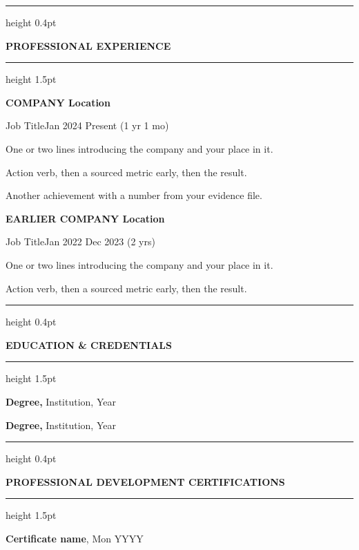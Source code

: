 \documentclass[a4paper,10pt]{article}
\newcommand{\bodyfont}{\fontsize{10.6}{13.1}\selectfont}
\newcommand{\Cap}[1]{{\fontsize{12}{13}\selectfont #1}}
\newcommand{\rsection}[1]{%
  \par\vspace{7pt}%
  {\color{textblack}\hrule height 0.4pt}%
  \vspace{3.5pt}%
  \centerline{\bfseries\fontsize{9.5}{13}\selectfont\MakeUppercase{#1}}%
  \vspace{2.5pt}%
  {\color{textblack}\hrule height 1.5pt}%
  \vspace{7pt}%
  \bodyfont
}
\newcommand{\job}[3]{%
  {\bfseries\fontsize{11}{13.2}\selectfont #1\par
   #2\hfill #3\par}%
  \vspace{4pt}\bodyfont
}
\begin{document}
\rsection{\Cap{P}rofessional \Cap{E}xperience}

\job{COMPANY \textendash{} Location}{Job Title}{Jan 2024 \textendash{} Present (1 yr 1 mo)}
One or two lines introducing the company and your place in it.\par
\begin{rbullets}
  \item Action verb, then a sourced metric early, then the result. %
  \item Another achievement with a number from your evidence file. %
\end{rbullets}

\job{EARLIER COMPANY \textendash{} Location}{Job Title}{Jan 2022 \textendash{} Dec 2023 (2 yrs)}
One or two lines introducing the company and your place in it.\par
\begin{rbullets}
  \item Action verb, then a sourced metric early, then the result. %
\end{rbullets}

\rsection{\Cap{E}ducation \Cap{\&} \Cap{C}redentials}
\textbf{Degree,} Institution, Year\par
\vspace{6pt}
\textbf{Degree,} Institution, Year\par

\rsection{\Cap{P}rofessional \Cap{D}evelopment \textendash{} \Cap{C}ertifications}
\textbf{Certificate name}, Mon YYYY\par
\end{document}

